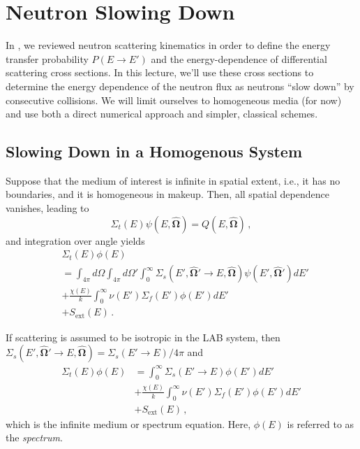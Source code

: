 \chapter{Neutron Slowing Down}
\label{lec:neutron_slowing_down}

In , we reviewed neutron scattering kinematics in order 
to define the energy transfer probability $P(E\to E')$ and the 
energy-dependence of differential scattering 
cross sections. In this 
lecture, we'll use these cross sections to determine the energy dependence 
of the neutron flux as neutrons ``slow down'' by consecutive collisions.
We will limit ourselves to homogeneous media (for now) and use 
both a direct numerical approach and simpler, classical schemes.


\section*{Slowing Down in a Homogenous System}

Suppose that the medium of interest is infinite in spatial extent, i.e.,
it has no boundaries, and it is homogeneous in makeup.  Then, all 
spatial dependence vanishes, leading to
\begin{equation}
       \Sigma_t(E) \psi (E, \bm{\hat{\Omega}})
            = Q(E, \bm{\hat{\Omega}}) \, ,
\end{equation}
and integration over angle yields
\begin{equation}
    \begin{split}
      & \Sigma_t(E)  \phi ( E) \\
        &= \int_{4\pi} d\Omega \int_{4\pi} d\Omega' \int^{\infty}_{0} \Sigma_s(E',\bm{\hat{\Omega}}' \to  E,\bm{\hat{\Omega}}) \psi(E', \bm{\hat{\Omega}'}) dE' \\
        &+ \frac{\chi(E)}{k} \int^{\infty}_{0} \nu(E')\Sigma_f(E') \phi(E') dE' \\
        &+ S_{\text{ext}}( E) \, .
    \end{split}
    \label{eq:infmedintegrated}
\end{equation}
    
If scattering is assumed to be isotropic in the LAB system, then 
$\Sigma_s(E',\bm{\hat{\Omega}}' \to  E,\bm{\hat{\Omega}}) = \Sigma_s(E'\to E)/4\pi$ and
\begin{equation}
\begin{split}
      \Sigma_t(E)  \phi (E) &= \int^{\infty}_{0} \Sigma_s( E' \to  E) \phi(E') dE' \\
        &+ \frac{\chi(E)}{k} \int^{\infty}_{0} \nu(E')\Sigma_f(E') \phi(E') dE' \\
        &+ S_{\text{ext}}(E) \, ,
\end{split}
\label{eq:infmedspectrum}
\end{equation}
which is the infinite medium or spectrum equation.  Here, $\phi (E)$ is 
referred to as the \emph{spectrum}.
    
